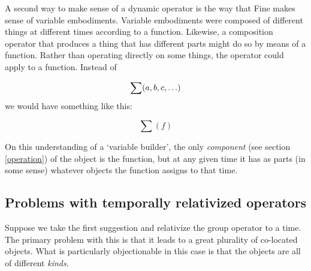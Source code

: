 \documentclass[11pt]{article}
\begin{document}
\begin{spacing}{1.5}
A second way to make sense of a dynamic operator is the way that Fine
makes sense of variable embodiments.  Variable embodiments were
composed of different things at different times according to a
function.  Likewise, a composition operator that produces a thing that
has different parts might do so by means of a function.  Rather than
operating directly on some things, the operator could apply to a
function.  Instead of

\begin{displaymath}
\sum (a, b, c, \mathellipsis )
\end{displaymath}
we would have something like this:

\begin{displaymath}
\sum ( f )
\end{displaymath}

On this understanding of a `variable builder', the only {\em
  component} (see section \ref{operation}) of the object is the
function, but at any given time it has as parts (in some sense)
whatever objects the function assigns to that time.




\subsection{Problems with temporally relativized operators}
\label{problems2a}
Suppose we take the first suggestion and relativize the group operator
to a time.  The primary problem with this is that it leads to a great
plurality of co-located objects.  What is particularly objectionable
in this case is that the objects are all of different {\em kinds}.


\end{spacing}
\end{document}
